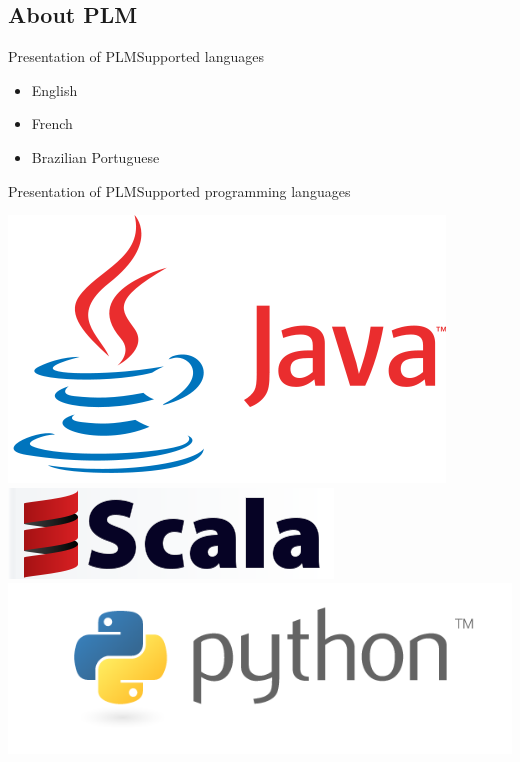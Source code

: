 \documentclass{beamer}
\begin{document}
\subsection{About PLM}


\begin{frame}{Presentation of PLM}{Supported languages}
  \begin{itemize}
    \item English
    \item French
    \item Brazilian Portuguese
  \end{itemize}
\end{frame}

\begin{frame}{Presentation of PLM}{Supported programming languages}
  \begin{center}
    \includegraphics[scale=0.16]{img/java.png}
    ~
    \includegraphics[scale=0.4]{img/scala.png}
    \includegraphics[scale=0.18]{img/python.png}
  \end{center}
\end{frame}
\end{document}
